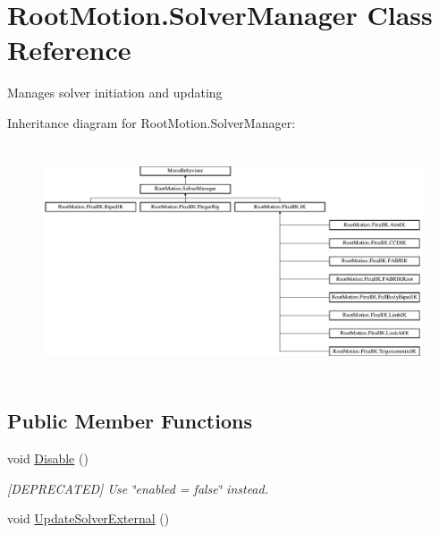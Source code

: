 \hypertarget{class_root_motion_1_1_solver_manager}{}\section{Root\+Motion.\+Solver\+Manager Class Reference}
\label{class_root_motion_1_1_solver_manager}


Manages solver initiation and updating  


Inheritance diagram for Root\+Motion.\+Solver\+Manager\+:\begin{figure}[H]
\begin{center}
\leavevmode
\includegraphics[height=6.905830cm]{class_root_motion_1_1_solver_manager}
\end{center}
\end{figure}
\subsection*{Public Member Functions}
\begin{DoxyCompactItemize}
\item 
void \mbox{\hyperlink{class_root_motion_1_1_solver_manager_a23240e6e1a897a0bb5d646b6c5af659f}{Disable}} ()
\begin{DoxyCompactList}\small\item\em \mbox{[}D\+E\+P\+R\+E\+C\+A\+T\+ED\mbox{]} Use \char`\"{}enabled = false\char`\"{} instead. \end{DoxyCompactList}\item 
void \mbox{\hyperlink{class_root_motion_1_1_solver_manager_acabe00dc2ad2b2b805db7ddd3a6c0ed8}{Update\+Solver\+External}} ()
\end{DoxyCompactItemize}
